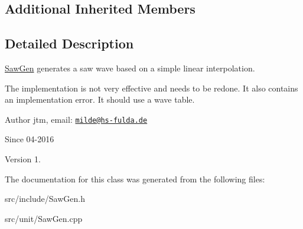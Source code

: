 \subsection*{Additional Inherited Members}


\subsection{Detailed Description}
\hyperlink{classunit_1_1SawGen}{Saw\-Gen} generates a saw wave based on a simple linear interpolation.

The implementation is not very effective and needs to be redone. It also contains an implementation error. It should use a wave table.

\begin{DoxyAuthor}{Author}
jtm, email\-:  \href{mailto:milde@hs-fulda.de}{\tt milde@hs-\/fulda.\-de} 
\end{DoxyAuthor}
\begin{DoxySince}{Since}
04-\/2016 
\end{DoxySince}
\begin{DoxyVersion}{Version}
1. 
\end{DoxyVersion}


The documentation for this class was generated from the following files\-:\begin{DoxyCompactItemize}
\item 
src/include/Saw\-Gen.\-h\item 
src/unit/Saw\-Gen.\-cpp\end{DoxyCompactItemize}

